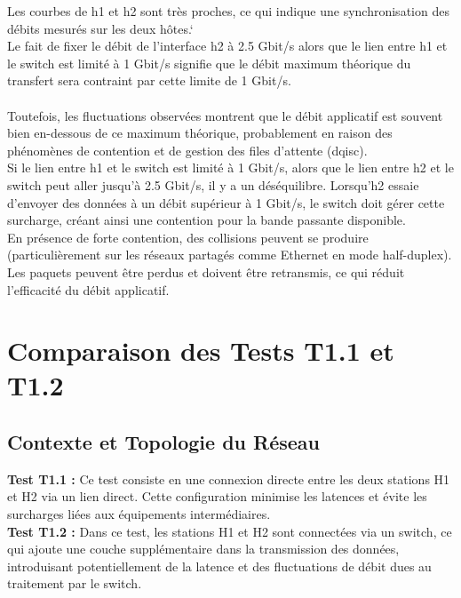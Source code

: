 Les courbes de h1 et h2 sont très proches, ce qui indique une synchronisation des débits mesurés sur les deux hôtes.`\\
Le fait de fixer le débit de l'interface h2 à 2.5 Gbit/s alors que le lien entre h1 et le switch est limité à 1 Gbit/s signifie que le débit maximum théorique du transfert sera contraint par cette limite de 1 Gbit/s.
\\
\\Toutefois, les fluctuations observées montrent que le débit applicatif est souvent bien en-dessous de ce maximum théorique, probablement en raison des phénomènes de contention et de gestion des files d'attente (dqisc).
\vspace{0.5cm}
\\
Si le lien entre h1 et le switch est limité à 1 Gbit/s, alors que le lien entre h2 et le switch peut aller jusqu'à 2.5 Gbit/s, il y a un déséquilibre.
Lorsqu'h2 essaie d'envoyer des données à un débit supérieur à 1 Gbit/s, le switch doit gérer cette surcharge, créant ainsi une contention pour la bande passante disponible.
\\
En présence de forte contention, des collisions peuvent se produire (particulièrement sur les réseaux partagés comme Ethernet en mode half-duplex).
Les paquets peuvent être perdus et doivent être retransmis, ce qui réduit l'efficacité du débit applicatif.



\newpage
\section{Comparaison des Tests T1.1 et T1.2}

\subsection{Contexte et Topologie du Réseau}
\textbf{Test T1.1 :} Ce test consiste en une connexion directe entre les deux stations H1 et H2 via un lien direct. Cette configuration minimise les latences et évite les surcharges liées aux équipements intermédiaires.\\
\textbf{Test T1.2 :} Dans ce test, les stations H1 et H2 sont connectées via un switch, ce qui ajoute une couche supplémentaire dans la transmission des données, introduisant potentiellement de la latence et des fluctuations de débit dues au traitement par le switch.

